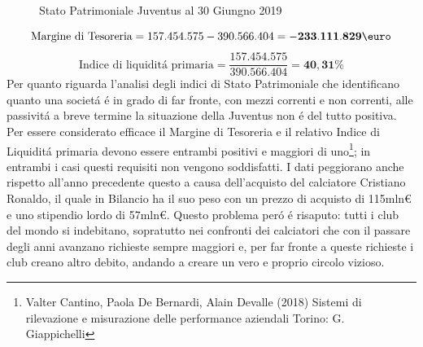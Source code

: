 \documentclass[
    corpo=12pt,
    oneside,
    evenboxes,
    tipotesi=triennale,
    stile=classica,
    oldstyle,
    autoretitolo,
    greek,
]{toptesi}
\begin{document}
\begin{interlinea}{1.5}
\begin{enumerate}
\begin{figure}
            \caption{Stato Patrimoniale Juventus al 30 Giungno 2019}
            \label{sp_juve}  
        \end{figure}
        \begin{equation}
                \text{Margine di Tesoreria} = 157.454.575-390.566.404 = \mathbf{-233.111.829\mbox{\euro}}
            \label{eqn: marg_teso_juve}
        \end{equation}
        \begin{equation}
                \text{Indice di liquidit\'a primaria} = \frac{157.454.575}{390.566.404} = \mathbf{40,31\%}
            \label{eqn: ind_liq_juve}
        \end{equation}
        Per quanto riguarda l'analisi degli indici di Stato Patrimoniale che identificano quanto una societ\'a \'e in grado di far 
        fronte, con mezzi correnti e non correnti, alle passivit\'a a breve termine la situazione della Juventus non \'e del tutto positiva.
        Per essere considerato efficace il Margine di Tesoreria e il relativo Indice di Liquidit\'a primaria devono essere entrambi positivi
        e maggiori di uno\footnote{Valter Cantino, Paola De Bernardi, Alain Devalle (2018) Sistemi di rilevazione e misurazione delle performance aziendali Torino: G. Giappichelli};
        in entrambi i casi questi requisiti non vengono soddisfatti. I dati peggiorano anche rispetto all'anno precedente
        questo a causa dell'acquisto del calciatore Cristiano Ronaldo, il quale in Bilancio ha il suo peso con un 
        prezzo di acquisto di 115mln€ e uno stipendio lordo di 57mln€. Questo problema per\'o \'e risaputo: tutti i club del mondo si indebitano,
        sopratutto nei confronti dei calciatori che con il passare degli anni avanzano richieste sempre maggiori e, per far fronte a queste 
        richieste i club creano altro debito, andando a creare un vero e proprio circolo vizioso.

\end{enumerate}
\end{interlinea}
\end{document}
